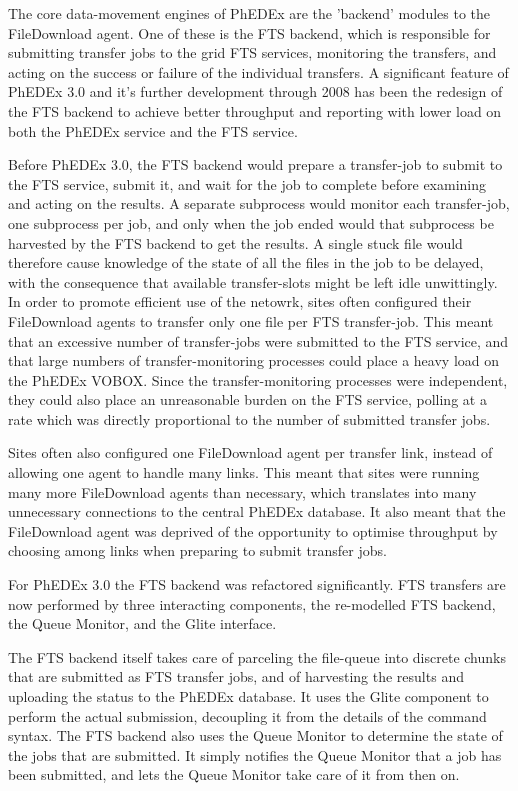 \documentclass{PoS}
\begin{document}
The core data-movement engines of PhEDEx are the 'backend' modules to
the FileDownload agent. One of these is the FTS backend, which is
responsible for submitting transfer jobs to the grid FTS services,
monitoring the transfers, and acting on the success or failure of the
individual transfers. A significant feature of PhEDEx 3.0 and it's
further development through 2008 has been the redesign of the FTS
backend to achieve better throughput and reporting with lower load on
both the PhEDEx service and the FTS service.

Before PhEDEx 3.0, the FTS backend would prepare a transfer-job to
submit to the FTS service, submit it, and wait for the job to complete
before examining and acting on the results. A separate subprocess
would monitor each transfer-job, one subprocess per job, and only when
the job ended would that subprocess be harvested by the FTS backend to
get the results. A single stuck file would therefore cause knowledge
of the state of all the files in the job to be delayed, with the
consequence that available transfer-slots might be left idle
unwittingly. In order to promote efficient use of the netowrk, sites
often configured their FileDownload agents to transfer only one file
per FTS transfer-job. This meant that an excessive number of
transfer-jobs were submitted to the FTS service, and that large
numbers of transfer-monitoring processes could place a heavy load on
the PhEDEx VOBOX. Since the transfer-monitoring processes were
independent, they could also place an unreasonable burden on the FTS
service, polling at a rate which was directly proportional to the
number of submitted transfer jobs.

Sites often also configured one FileDownload agent per transfer link,
instead of allowing one agent to handle many links. This meant that
sites were running many more FileDownload agents than necessary, which
translates into many unnecessary connections to the central PhEDEx
database. It also meant that the FileDownload agent was deprived of
the opportunity to optimise throughput by choosing among links when
preparing to submit transfer jobs.

For PhEDEx 3.0 the FTS backend was refactored significantly. FTS
transfers are now performed by three interacting components, the
re-modelled FTS backend, the Queue Monitor, and the Glite interface.

The FTS backend itself takes care of parceling the file-queue into
discrete chunks that are submitted as FTS transfer jobs, and of
harvesting the results and uploading the status to the PhEDEx
database. It uses the Glite component to perform the actual
submission, decoupling it from the details of the command syntax. The
FTS backend also uses the Queue Monitor to determine the state of the
jobs that are submitted. It simply notifies the Queue Monitor that a
job has been submitted, and lets the Queue Monitor take care of it
from then on.
\end{document}
